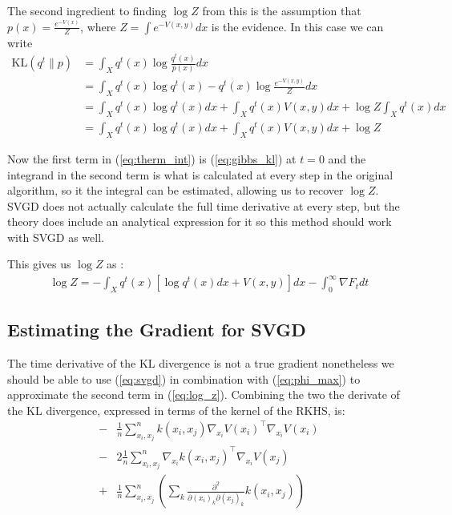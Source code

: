 \documentclass{article}
\begin{document}
The second ingredient to finding $\log Z$ from this is the assumption that $p(x) = \frac{ e^{-V(x)} }{ Z }$, 
where $Z = \int e^{-V(x, y)} dx$ is the evidence. In this case we can write
\begin{align}
\label{eq:gibbs_kl}
    \text{KL}( q^t \| p ) &= \int_X q^t(x) \log \frac{ q^t(x) }{ p(x) } dx \\
                    &= \int_X q^t(x) \log q^t(x) - q^t(x) \log \frac{ e^{-V(x, y)} }{ Z } dx \\
                    &= \int_X q^t(x) \log q^t(x) dx + \int_X q^t(x) V(x, y) dx + \log Z \int_X q^t(x) dx \\
                    &= \int_X q^t(x) \log q^t(x) dx + \int_X q^t(x) V(x, y) dx + \log Z
\end{align}

Now the first term in (\ref{eq:therm_int}) is (\ref{eq:gibbs_kl}) at $t=0$ and the integrand in the second term is
what is calculated at every step in the original algorithm, so it the integral can be estimated, allowing us to 
recover $\log Z$. SVGD does not actually calculate the full time derivative at every step, but the theory does 
include an analytical expression for it so this method should work with SVGD as well.

This gives us $\log Z$ as :
\begin{align}
\label{eq:log_z}
    \log Z = - \int_X q^t(x) [\log q^t(x) dx +  V(x, y)] dx 
        - \int_0^\infty \nabla F_t dt
\end{align}


\subsection{Estimating the Gradient for SVGD}
The time derivative of the KL divergence is not a true gradient nonetheless we should be able to use
(\ref{eq:svgd}) in combination with (\ref{eq:phi_max}) to approximate the second term in (\ref{eq:log_z}).
Combining the two the derivate of the KL divergence, expressed in terms of the kernel of the RKHS, is:
\begin{align}
    \label{eq:F_approximation}
    -& \frac{1}{n}\sum_{x_i,x_j}^n  k(x_i,x_j) \nabla_{x_i} V(x_i)^\top \nabla_{x_i} V(x_i)  \\ 
    -& 2 \frac{1}{n}\sum_{x_i,x_j}^n  \nabla_{x_i} k(x_i,x_j)^\top \nabla_{x_i} V(x_j)  \\ 
    +& \frac{1}{n}\sum_{x_i,x_j}^n \left( \sum_k \frac{ \partial^2 }{ \partial (x_i)_k \partial (x_j)_k } 
        k(x_i,x_j) \right)
\end{align}
\end{document}
